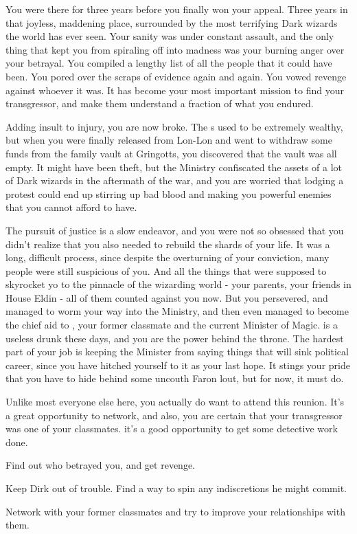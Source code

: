 \documentclass[char]{Katmeers}
\begin{document}
You were there for three years before you finally won your appeal. Three years in that joyless, maddening place, surrounded by the most terrifying Dark wizards the world has ever seen. Your sanity was under constant assault, and the only thing that kept you from spiraling off into madness was your burning anger over your betrayal. You compiled a lengthy list of all the people that it could have been. You pored over the scraps of evidence again and again. You vowed revenge against whoever it was. It has become your most important mission to find your transgressor, and make them understand a fraction of what you endured.

Adding insult to injury, you are now broke. The \cLucius{\formal}s used to be extremely wealthy, but when you were finally released from Lon-Lon and went to withdraw some funds from the family vault at Gringotts, you discovered that the vault was all empty. It might have been theft, but the Ministry confiscated the assets of a lot of Dark wizards in the aftermath of the war, and you are worried that lodging a protest could end up stirring up bad blood and making you powerful enemies that you cannot afford to have.

The pursuit of justice is a slow endeavor, and you were not so obsessed that you didn't realize that you also needed to rebuild the shards of your life. It was a long, difficult process, since despite the overturning of your conviction, many people were still suspicious of you. And all the things that were supposed to skyrocket yo to the pinnacle of the wizarding world - your parents, your friends in House Eldin - all of them counted against you now. But you persevered, and managed to worm your way into the Ministry, and then even managed to become the chief aid to \cRon{}, your former classmate and the current Minister of Magic. \cRon{} is a useless drunk these days, and you are the power behind the throne. The hardest part of your job is keeping the Minister from saying things that will sink \cRon{\their} political career, since you have hitched yourself to it as your last hope. It stings your pride that you have to hide behind some uncouth Faron lout, but for now, it must do.

Unlike most everyone else here, you actually do want to attend this reunion. It's a great opportunity to network, and  also, you are certain that your transgressor was one of your classmates. it's a good opportunity to get some detective work done.

\begin{itemz}[Goals]
	\item Find out who betrayed you, and get revenge.
	\item Keep Dirk out of trouble. Find a way to spin any indiscretions he might commit.
	\item Network with your former classmates and try to improve your relationships with them.
\end{itemz}
\end{document}
